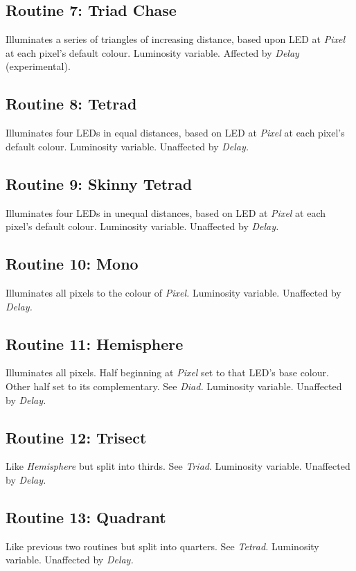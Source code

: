 \documentclass{article}
\begin{document}
	\subsection{Routine 7: Triad Chase}
	Illuminates a series of triangles of increasing distance, based upon LED at 
	\emph{Pixel} at each pixel's default colour. Luminosity variable. Affected 
	by \emph{Delay} (experimental).

	\subsection{Routine 8: Tetrad}
	Illuminates four LEDs in equal distances, based on LED at \emph{Pixel} at 
	each pixel's default colour. Luminosity variable. Unaffected by 
	\emph{Delay.}

	\subsection{Routine 9: Skinny Tetrad}
	Illuminates four LEDs in unequal distances, based on LED at \emph{Pixel} at 
	each pixel's default colour. Luminosity variable. Unaffected by 
	\emph{Delay.}

	\subsection{Routine 10: Mono}
	Illuminates all pixels to the colour of \emph{Pixel.} Luminosity variable. 
	Unaffected by \emph{Delay.}

	\subsection{Routine 11: Hemisphere}
	Illuminates all pixels. Half beginning at \emph{Pixel} set to that LED's 
	base colour. Other half set to its complementary. See \emph{Diad.} 
	Luminosity variable. Unaffected by \emph{Delay.}

	\subsection{Routine 12: Trisect}
	Like \emph{Hemisphere} but split into thirds. See \emph{Triad}. Luminosity 
	variable. Unaffected by \emph{Delay.}

	\subsection{Routine 13: Quadrant}
	Like previous two routines but split into quarters. See \emph{Tetrad.} 
	Luminosity variable. Unaffected by \emph{Delay.}
\end{document}
